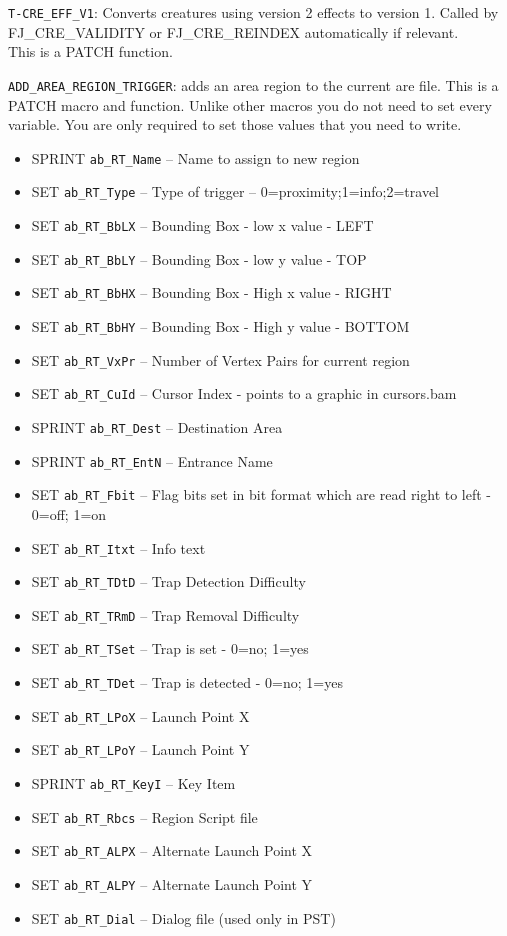 \documentclass{article}
\begin{document}
\verb+T-CRE_EFF_V1+: Converts creatures using version 2 effects to
version 1. Called by FJ_CRE_VALIDITY or FJ_CRE_REINDEX automatically
if relevant.\\
This is a PATCH function.

\verb+ADD_AREA_REGION_TRIGGER+: adds an area region to the current are file.
This is a PATCH macro and function. Unlike other macros you do not need to set every variable. You are only required to set those values that you need to write.
\begin{itemize}
\item SPRINT \verb+ab_RT_Name+ -- Name to assign to new region
\item SET \verb+ab_RT_Type+ -- Type of trigger -- 0=proximity;1=info;2=travel
\item SET \verb+ab_RT_BbLX+ -- Bounding Box - low x value  - LEFT
\item SET \verb+ab_RT_BbLY+ -- Bounding Box - low y value  - TOP
\item SET \verb+ab_RT_BbHX+ -- Bounding Box - High x value - RIGHT
\item SET \verb+ab_RT_BbHY+ -- Bounding Box - High y value - BOTTOM
\item SET \verb+ab_RT_VxPr+ -- Number of Vertex Pairs for current region
\item SET \verb+ab_RT_CuId+ -- Cursor Index - points to a graphic in cursors.bam
\item SPRINT \verb+ab_RT_Dest+ -- Destination Area
\item SPRINT \verb+ab_RT_EntN+ -- Entrance Name
\item SET \verb+ab_RT_Fbit+ -- Flag bits set in bit format which are read right to left - 0=off; 1=on
\item SET \verb+ab_RT_Itxt+ -- Info text
\item SET \verb+ab_RT_TDtD+ -- Trap Detection Difficulty
\item SET \verb+ab_RT_TRmD+ -- Trap Removal Difficulty
\item SET \verb+ab_RT_TSet+ -- Trap is set - 0=no; 1=yes
\item SET \verb+ab_RT_TDet+ -- Trap is detected - 0=no; 1=yes
\item SET \verb+ab_RT_LPoX+ -- Launch Point X
\item SET \verb+ab_RT_LPoY+ -- Launch Point Y
\item SPRINT \verb+ab_RT_KeyI+ -- Key Item
\item SET \verb+ab_RT_Rbcs+ -- Region Script file
\item SET \verb+ab_RT_ALPX+ -- Alternate Launch Point X
\item SET \verb+ab_RT_ALPY+ -- Alternate Launch Point Y
\item SET \verb+ab_RT_Dial+ -- Dialog file (used only in PST)
\end{itemize}
\end{document}
